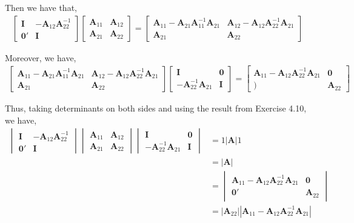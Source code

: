 \documentclass[12pt]{article}\usepackage[]{graphicx}\usepackage[]{color}
\newcommand{\vct}{\mathbf}
\begin{document}
Then we have that,
\begin{align*}
\begin{bmatrix} \vct{I} & -\vct{A}_{12}\vct{A}_{22}^{-1} \\ \vct{0'} & \vct{I}\end{bmatrix}\begin{bmatrix} \vct{A}_{11} & \vct{A}_{12} \\ \vct{A}_{21} & \vct{A}_{22} \end{bmatrix} = \begin{bmatrix} \vct{A}_{11} - \vct{A}_{21}\vct{A}_{11}^{-1}\vct{A}_{21} & \vct{A}_{12} - \vct{A}_{12}\vct{A}_{22}^{-1}\vct{A}_{21} \\ \vct{A}_{21} & \vct{A}_{22} \end{bmatrix}
\end{align*}

Moreover, we have,
\begin{align*}
\begin{bmatrix} \vct{A}_{11} - \vct{A}_{21}\vct{A}_{11}^{-1}\vct{A}_{21} & \vct{A}_{12} - \vct{A}_{12}\vct{A}_{22}^{-1}\vct{A}_{21} \\ \vct{A}_{21} & \vct{A}_{22} \end{bmatrix} \begin{bmatrix} \vct{I} &  \vct{0} \\ -\vct{A}_{22}^{-1}\vct{A}_{21} & \vct{I} \end{bmatrix} = \begin{bmatrix} \vct{A}_{11} - \vct{A}_{12}\vct{A}_{22}^{-1}\vct{A}_{21} & \vct{0} \\ \vct{)} & \vct{A}_{22} \end{bmatrix}
\end{align*}

Thus, taking determinants on both sides and using the result from Exercise 4.10, we have,
\begin{align*}
\begin{vmatrix} \vct{I} & -\vct{A}_{12}\vct{A}_{22}^{-1} \\ \vct{0'} & \vct{I}\end{vmatrix}\begin{vmatrix} \vct{A}_{11} & \vct{A}_{12} \\ \vct{A}_{21} & \vct{A}_{22} \end{vmatrix}\begin{vmatrix} \vct{I} &  \vct{0} \\ -\vct{A}_{22}^{-1}\vct{A}_{21} & \vct{I} \end{vmatrix} &= 1 |\vct{A}| 1\\
&= |\vct{A}|\\
&= \begin{vmatrix} \vct{A}_{11} - \vct{A}_{12}\vct{A}_{22}^{-1}\vct{A}_{21} & \vct{0} \\ \vct{0'} & \vct{A}_{22} \end{vmatrix}\\
&= |\vct{A}_{22}||\vct{A}_{11} - \vct{A}_{12}\vct{A}_{22}^{-1}\vct{A}_{21}|
\end{align*}
\end{document}
